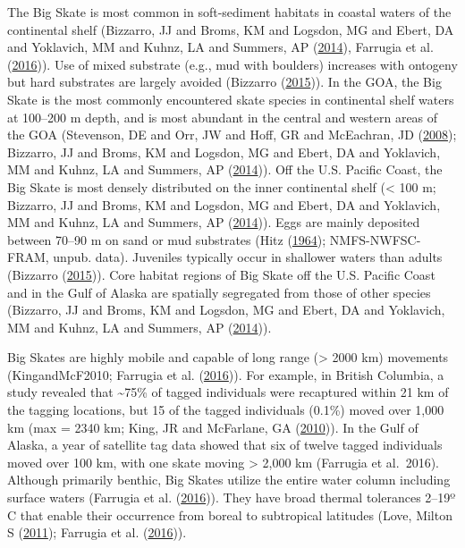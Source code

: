 \documentclass[12pt,]{article}
\begin{document}
The Big Skate is most common in soft-sediment habitats in coastal waters
of the continental shelf (Bizzarro, JJ and Broms, KM and Logsdon, MG and
Ebert, DA and Yoklavich, MM and Kuhnz, LA and Summers, AP
(\protect\hyperlink{ref-Bizzarro2014}{2014}), Farrugia et al.
(\protect\hyperlink{ref-Farrugia2016}{2016})). Use of mixed substrate
(e.g., mud with boulders) increases with ontogeny but hard substrates
are largely avoided (Bizzarro
(\protect\hyperlink{ref-Bizzarro2015}{2015})). In the GOA, the Big Skate
is the most commonly encountered skate species in continental shelf
waters at 100--200 m depth, and is most abundant in the central and
western areas of the GOA (Stevenson, DE and Orr, JW and Hoff, GR and
McEachran, JD (\protect\hyperlink{ref-Stevenson2008}{2008}); Bizzarro,
JJ and Broms, KM and Logsdon, MG and Ebert, DA and Yoklavich, MM and
Kuhnz, LA and Summers, AP (\protect\hyperlink{ref-Bizzarro2014}{2014})).
Off the U.S. Pacific Coast, the Big Skate is most densely distributed on
the inner continental shelf (\textless{} 100 m; Bizzarro, JJ and Broms,
KM and Logsdon, MG and Ebert, DA and Yoklavich, MM and Kuhnz, LA and
Summers, AP (\protect\hyperlink{ref-Bizzarro2014}{2014})). Eggs are
mainly deposited between 70--90 m on sand or mud substrates (Hitz
(\protect\hyperlink{ref-Hitz1964}{1964}); NMFS-NWFSC-FRAM, unpub. data).
Juveniles typically occur in shallower waters than adults (Bizzarro
(\protect\hyperlink{ref-Bizzarro2015}{2015})). Core habitat regions of
Big Skate off the U.S. Pacific Coast and in the Gulf of Alaska are
spatially segregated from those of other species (Bizzarro, JJ and
Broms, KM and Logsdon, MG and Ebert, DA and Yoklavich, MM and Kuhnz, LA
and Summers, AP (\protect\hyperlink{ref-Bizzarro2014}{2014})).

Big Skates are highly mobile and capable of long range (\textgreater{}
2000 km) movements (KingandMcF2010; Farrugia et al.
(\protect\hyperlink{ref-Farrugia2016}{2016})). For example, in British
Columbia, a study revealed that \textasciitilde{}75\% of tagged
individuals were recaptured within 21 km of the tagging locations, but
15 of the tagged individuals (0.1\%) moved over 1,000 km (max = 2340 km;
King, JR and McFarlane, GA
(\protect\hyperlink{ref-KingandMcF2010}{2010})). In the Gulf of Alaska,
a year of satellite tag data showed that six of twelve tagged
individuals moved over 100 km, with one skate moving \textgreater{}
2,000 km (Farrugia et al.~2016). Although primarily benthic, Big Skates
utilize the entire water column including surface waters (Farrugia et
al. (\protect\hyperlink{ref-Farrugia2016}{2016})). They have broad
thermal tolerances 2--19º C that enable their occurrence from boreal to
subtropical latitudes (Love, Milton S
(\protect\hyperlink{ref-Love2011}{2011}); Farrugia et al.
(\protect\hyperlink{ref-Farrugia2016}{2016})).
\end{document}
